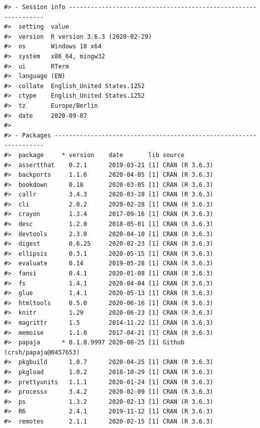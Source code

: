 \documentclass[
  english,
  doc,floatsintext,draftall]{apa6}
\begin{document}
\begin{verbatim}
#> - Session info ---------------------------------------------------------------
#>  setting  value                       
#>  version  R version 3.6.3 (2020-02-29)
#>  os       Windows 10 x64              
#>  system   x86_64, mingw32             
#>  ui       RTerm                       
#>  language (EN)                        
#>  collate  English_United States.1252  
#>  ctype    English_United States.1252  
#>  tz       Europe/Berlin               
#>  date     2020-09-07                  
#> 
#> - Packages -------------------------------------------------------------------
#>  package     * version    date       lib source                      
#>  assertthat    0.2.1      2019-03-21 [1] CRAN (R 3.6.3)              
#>  backports     1.1.6      2020-04-05 [1] CRAN (R 3.6.3)              
#>  bookdown      0.18       2020-03-05 [1] CRAN (R 3.6.3)              
#>  callr         3.4.3      2020-03-28 [1] CRAN (R 3.6.3)              
#>  cli           2.0.2      2020-02-28 [1] CRAN (R 3.6.3)              
#>  crayon        1.3.4      2017-09-16 [1] CRAN (R 3.6.3)              
#>  desc          1.2.0      2018-05-01 [1] CRAN (R 3.6.3)              
#>  devtools      2.3.0      2020-04-10 [1] CRAN (R 3.6.3)              
#>  digest        0.6.25     2020-02-23 [1] CRAN (R 3.6.3)              
#>  ellipsis      0.3.1      2020-05-15 [1] CRAN (R 3.6.3)              
#>  evaluate      0.14       2019-05-28 [1] CRAN (R 3.6.3)              
#>  fansi         0.4.1      2020-01-08 [1] CRAN (R 3.6.3)              
#>  fs            1.4.1      2020-04-04 [1] CRAN (R 3.6.3)              
#>  glue          1.4.1      2020-05-13 [1] CRAN (R 3.6.3)              
#>  htmltools     0.5.0      2020-06-16 [1] CRAN (R 3.6.3)              
#>  knitr         1.29       2020-06-23 [1] CRAN (R 3.6.3)              
#>  magrittr      1.5        2014-11-22 [1] CRAN (R 3.6.3)              
#>  memoise       1.1.0      2017-04-21 [1] CRAN (R 3.6.3)              
#>  papaja      * 0.1.0.9997 2020-08-25 [1] Github (crsh/papaja@0457653)
#>  pkgbuild      1.0.7      2020-04-25 [1] CRAN (R 3.6.3)              
#>  pkgload       1.0.2      2018-10-29 [1] CRAN (R 3.6.3)              
#>  prettyunits   1.1.1      2020-01-24 [1] CRAN (R 3.6.3)              
#>  processx      3.4.2      2020-02-09 [1] CRAN (R 3.6.3)              
#>  ps            1.3.2      2020-02-13 [1] CRAN (R 3.6.3)              
#>  R6            2.4.1      2019-11-12 [1] CRAN (R 3.6.3)              
#>  remotes       2.1.1      2020-02-15 [1] CRAN (R 3.6.3)              

\end{verbatim}
\end{document}
